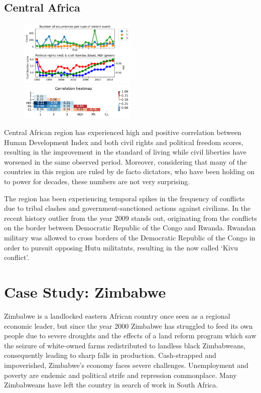 \documentclass[a4paper,11pt]{article}
\begin{document}
\subsection{Central Africa}
\begin{figure}[ht!]
    \includegraphics[width=0.50\textwidth]{images/ca.pdf}
    \includegraphics[width=0.50\textwidth]{images/ca_corr.pdf}
\end{figure}
Central African region has experienced high and positive correlation between Human Development Index and both civil rights and political freedom scores, resulting in the improvement in the standard of living while civil liberties have worsened in the same observed period. Moreover, considering that many of the countries in this region are ruled by de facto dictators, who have been holding on to power for decades, these numbers are not very surprising.

The region has been experiencing temporal spikes in the frequency of conflicts due to tribal clashes and government-sanctioned actions against civilians. In the recent history outlier from the year 2009 stands out, originating from the conflicts on the border between Democratic Republic of the Congo and Rwanda. Rwandan military was allowed to cross borders of the Democratic Republic of the Congo in order to pursuit opposing Hutu militatnts, resulting in the now called ‘Kivu conflict’.


\section{Case Study: Zimbabwe}
Zimbabwe is a landlocked eastern African country once seen as a regional economic leader, but since the year 2000 Zimbabwe has struggled to feed its own people due to severe droughts and the effects of a land reform program which saw the seizure of white-owned farms redistributed to landless black Zimbabweans, consequently leading to sharp falls in production. Cash-strapped and impoverished, Zimbabwe's economy faces severe challenges. Unemployment and poverty are endemic and political strife and repression commonplace. Many Zimbabweans have left the country in search of work in South Africa.
\end{document}
